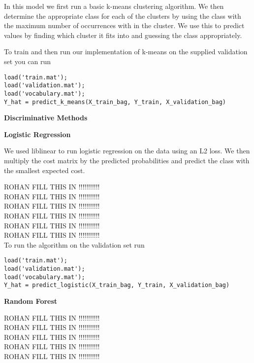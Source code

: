 \documentclass[12pt, a4paper]{article}
\begin{document}
\vspace{3mm}

In this model we first run a basic k-means clustering algorithm. We then determine the appropriate class for each of the clusters by using the class with the maximum number of occurrences with in the cluster. We use this to predict values by finding which cluster it fits into and guessing the class appropriately. 

To train and then run our implementation of k-means on the supplied validation set you can run 
\begin{verbatim}
load('train.mat');
load('validation.mat');
load('vocabulary.mat');
Y_hat = predict_k_means(X_train_bag, Y_train, X_validation_bag)
\end{verbatim}


\vspace{5mm}

{\Large\textbf{Discriminative Methods}}

\vspace{3mm}

{\large\textbf{Logistic Regression}}

\vspace{3mm}

We used liblinear to run logistic regression on the data using an L2 loss. We then multiply the cost matrix by the predicted probabilities and predict the class with the smallest expected cost.

ROHAN FILL THIS IN !!!!!!!!!!!\\
ROHAN FILL THIS IN !!!!!!!!!!!\\
ROHAN FILL THIS IN !!!!!!!!!!!\\
ROHAN FILL THIS IN !!!!!!!!!!!\\
ROHAN FILL THIS IN !!!!!!!!!!!\\
ROHAN FILL THIS IN !!!!!!!!!!!\\

To run the algorithm on the validation set run
\begin{verbatim}
load('train.mat');
load('validation.mat');
load('vocabulary.mat');
Y_hat = predict_logistic(X_train_bag, Y_train, X_validation_bag)
\end{verbatim}

\vspace{3mm}

{\large\textbf{Random Forest}}

\vspace{3mm}

ROHAN FILL THIS IN !!!!!!!!!!!\\
ROHAN FILL THIS IN !!!!!!!!!!!\\
ROHAN FILL THIS IN !!!!!!!!!!!\\
ROHAN FILL THIS IN !!!!!!!!!!!\\
ROHAN FILL THIS IN !!!!!!!!!!!\\
\end{document}
